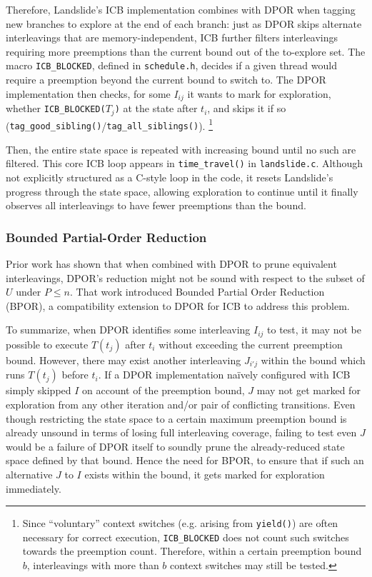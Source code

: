 Therefore, Landslide's ICB implementation combines with DPOR
when tagging new branches to explore at the end of each branch:
just as DPOR skips alternate interleavings that are memory-independent,
ICB further filters interleavings requiring more preemptions than the current bound
out of the to-explore set.
The macro {\tt ICB\_BLOCKED},
defined in {\tt schedule.h},
decides if a given thread would require a preemption beyond the current bound to switch to.
The DPOR implementation then checks, for some $I_{ij}$ it wants to mark for exploration,
whether {\tt ICB\_BLOCKED(}$T_j${\tt )} at the state after $t_i$,
and skips it if so ({\tt tag\_good\_sibling()}/{\tt tag\_all\_siblings()}).
\footnote{Since ``voluntary'' context switches (e.g. arising from {\tt yield()})
are often necessary for correct execution,
{\tt ICB\_BLOCKED} does not count such switches towards the preemption count.
Therefore, within a certain preemption bound $b$,
interleavings with more than $b$ context switches may still be tested.}

Then, the entire state space is repeated with increasing bound until no such are filtered.
This core ICB loop appears in {\tt time\_travel()} in {\tt landslide.c}.
Although not explicitly structured as a C-style loop in the code,
it resets Landslide's progress through the state space,
allowing exploration to continue until it finally observes all interleavings to have fewer preemptions than the bound.

\subsubsection{Bounded Partial-Order Reduction}

Prior work \cite{bpor} has shown that
when combined with DPOR to prune equivalent interleavings,
DPOR's reduction might not be sound with respect to the subset of $U$ under $P \le n$.
That work introduced Bounded Partial Order Reduction (BPOR),
a compatibility extension to DPOR for ICB to address this problem.

To summarize, when DPOR identifies some interleaving $I_{ij}$ to test,
it may not be possible to execute $T(t_j)$ after $t_i$ without exceeding the current preemption bound.
However, there may exist another interleaving $J_{i'j}$ within the bound which runs $T(t_j)$ before $t_i$.
If a DPOR implementation na\"ively configured with ICB simply skipped $I$ on account of the preemption bound,
$J$ may not get marked for exploration
from any other iteration and/or pair of conflicting transitions.
Even though restricting the state space to a certain maximum preemption bound is already unsound
in terms of losing full interleaving coverage,
failing to test even $J$ would be a failure of DPOR itself
to soundly prune the already-reduced state space defined by that bound.
Hence the need for BPOR, to ensure that if such an alternative $J$ to $I$ exists within the bound,
it gets marked for exploration immediately.

